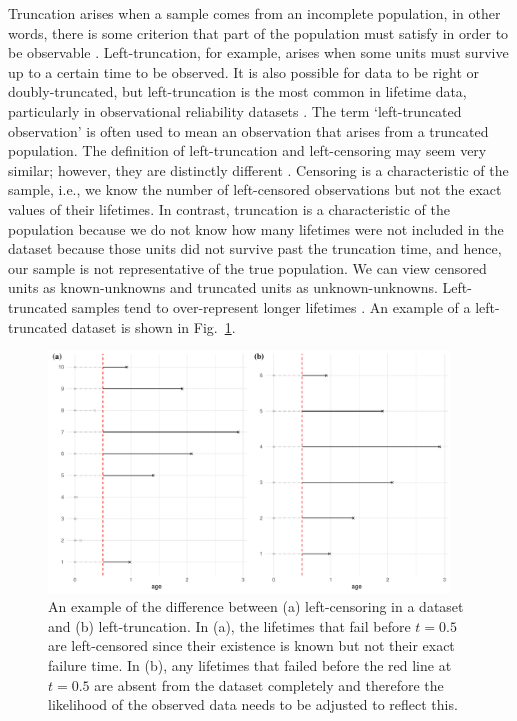 Truncation arises when a sample comes from an incomplete population, in other words, there is some criterion that part of the population must satisfy in order to be observable \citep{guo1993}. Left-truncation, for example, arises when some units must survive up to a certain time to be observed. It is also possible for data to be right or doubly-truncated, but left-truncation is the most common in lifetime data, particularly in observational reliability datasets \citep{Emura2022}. The term `left-truncated observation' is often used to mean an observation that arises from a truncated population. The definition of left-truncation and left-censoring may seem very similar; however, they are distinctly different \citep{mitra2013}. Censoring is a characteristic of the sample, i.e., we know the number of left-censored observations but not the exact values of their lifetimes. In contrast, truncation is a characteristic of the population because we do not know how many lifetimes were not included in the dataset because those units did not survive past the truncation time, and hence, our sample is not representative of the true population. We can view censored units as known-unknowns and truncated units as unknown-unknowns. Left-truncated samples tend to over-represent longer lifetimes \citep{guo1993}. An example of a left-truncated dataset is shown in Fig.~\ref{fig:left_trunc_example}.

\begin{figure}
    \centering
    \includegraphics[width=0.95\textwidth]{./figures/ch-2/left_truncation_example.pdf}
    \caption{An example of the difference between (a) left-censoring in a dataset and (b) left-truncation. In (a), the lifetimes that fail before $t = 0.5$ are left-censored since their existence is known but not their exact failure time. In (b), any lifetimes that failed before the red line at $t = 0.5$ are absent from the dataset completely and therefore the likelihood of the observed data needs to be adjusted to reflect this.}
    \label{fig:left_trunc_example}
\end{figure}

